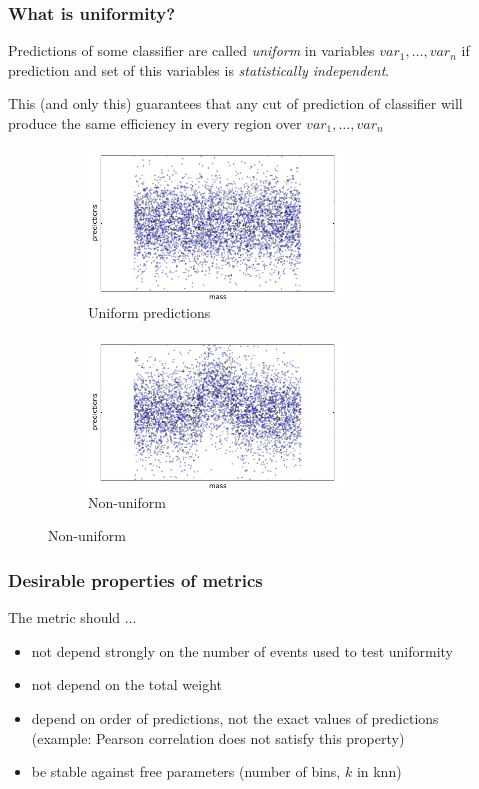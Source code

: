 \documentclass{beamer}
\begin{document}
\begin{frame}
    \frametitle{What is uniformity?}
    Predictions of some classifier are called \textit{uniform} in variables $var_1, \dots, var_n$ if prediction and set of this variables is \textit{statistically independent}. 

    This (and only this) guarantees that any cut of prediction of classifier will produce the same efficiency in every region over $var_1, \dots, var_n$

    \pause

    \begin{figure}
        \centering
        \begin{subfigure}[b]{0.48\textwidth}
            \includegraphics[width=\textwidth, height=4cm]{img/uniform.pdf}
            \caption{Uniform predictions}
        \end{subfigure}
        \begin{subfigure}[b]{0.48\textwidth}
            \includegraphics[width=\textwidth, height=4cm]{img/nonuniform.pdf}
            \caption{Non-uniform}
        \end{subfigure}
    \end{figure}

\end{frame}

\begin{frame}
    \frametitle{Desirable properties of metrics}
    The metric should ...
    \begin{itemize}
    \item not depend strongly on the number of events used to test uniformity

    \item not depend on the total weight 

    \item depend on order of predictions, not the exact values of predictions \\
        (example: Pearson correlation does not satisfy this property)

    \item be stable against free parameters (number of bins, $k$ in knn)
    \end{itemize}
\end{frame}
\end{document}
